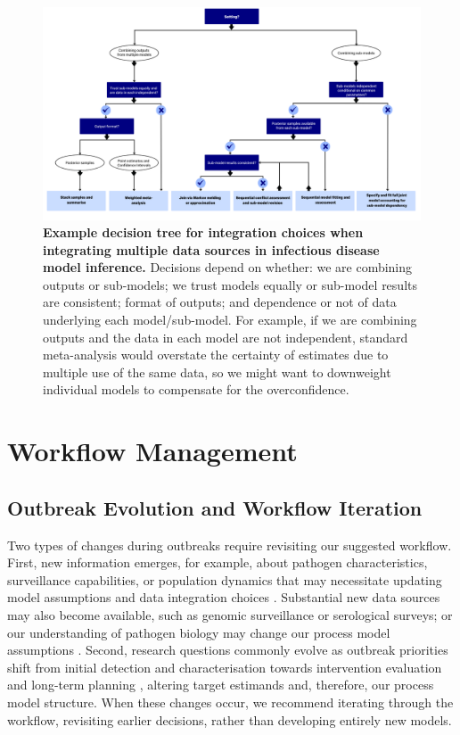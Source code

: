 \documentclass{article}
\begin{document}
\begin{figure}[htbp]
    \centering
    \includegraphics[width=\textwidth]{figures/Abbott et al figure 4.png}
    \caption{\textbf{Example decision tree for integration choices when integrating multiple data sources in infectious disease model inference.} Decisions depend on whether: we are combining outputs or sub-models; we trust models equally or sub-model results are consistent; format of outputs; and dependence or not of data underlying each model/sub-model. For example, if we are combining outputs and the data in each model are not independent, standard meta-analysis would overstate the certainty of estimates due to multiple use of the same data, so we might want to downweight individual models to compensate for the overconfidence.}
    \label{fig:integration}
\end{figure}

\section{Workflow Management}

\subsection{Outbreak Evolution and Workflow Iteration}  \label{sec:outbreak}
Two types of changes during outbreaks require revisiting our suggested workflow.
First, new information emerges, for example, about pathogen characteristics, surveillance capabilities, or population dynamics that may necessitate updating model assumptions and data integration choices \citep{mccaw2023role}. Substantial new data sources may also become available, such as genomic surveillance or serological surveys; or our understanding of pathogen biology may change our process model assumptions \citep{knock2021key}. 
Second, research questions commonly evolve as outbreak priorities shift from initial detection and characterisation towards intervention evaluation and long-term planning \citep{who-mosaic-2023}, altering target estimands and, therefore, our process model structure.
When these changes occur, we recommend iterating through the workflow, revisiting earlier decisions, rather than developing entirely new models.
\end{document}
